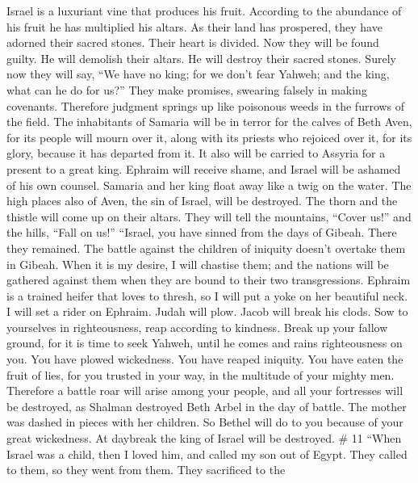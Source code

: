  Israel is a luxuriant vine that produces his fruit.
According to the abundance of his fruit he has multiplied his altars. As
their land has prospered, they have adorned their sacred stones.
 Their heart is divided. Now they will be found guilty. He
will demolish their altars. He will destroy their sacred stones.
 Surely now they will say, ``We have no king; for we don't
fear Yahweh; and the king, what can he do for us?''  They
make promises, swearing falsely in making covenants. Therefore judgment
springs up like poisonous weeds in the furrows of the field.
 The inhabitants of Samaria will be in terror for the
calves of Beth Aven, for its people will mourn over it, along with its
priests who rejoiced over it, for its glory, because it has departed
from it.  It also will be carried to Assyria for a present
to a great king. Ephraim will receive shame, and Israel will be ashamed
of his own counsel.  Samaria and her king float away like
a twig on the water.  The high places also of Aven, the
sin of Israel, will be destroyed. The thorn and the thistle will come up
on their altars. They will tell the mountains, ``Cover us!'' and the
hills, ``Fall on us!''  ``Israel, you have sinned from the
days of Gibeah. There they remained. The battle against the children of
iniquity doesn't overtake them in Gibeah.  When it is my
desire, I will chastise them; and the nations will be gathered against
them when they are bound to their two transgressions. 
Ephraim is a trained heifer that loves to thresh, so I will put a yoke
on her beautiful neck. I will set a rider on Ephraim. Judah will plow.
Jacob will break his clods.  Sow to yourselves in
righteousness, reap according to kindness. Break up your fallow ground,
for it is time to seek Yahweh, until he comes and rains righteousness on
you.  You have plowed wickedness. You have reaped
iniquity. You have eaten the fruit of lies, for you trusted in your way,
in the multitude of your mighty men.  Therefore a battle
roar will arise among your people, and all your fortresses will be
destroyed, as Shalman destroyed Beth Arbel in the day of battle. The
mother was dashed in pieces with her children.  So Bethel
will do to you because of your great wickedness. At daybreak the king of
Israel will be destroyed. \# 11  ``When Israel was a
child, then I loved him, and called my son out of Egypt. 
They called to them, so they went from them. They sacrificed to the
